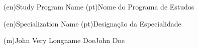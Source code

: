 %
%
%
%
\ntdegreename(en){Study Program Name}          %
\ntdegreename(pt){Nome do Programa de Estudos} %



%
%
%
%
\ntspecialization(en){Specialization Name}         %
\ntspecialization(pt){Designação da Especialidade} %



%
%
\ntauthorname(m){John Very Longname Doe}{John Doe}



